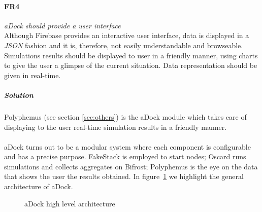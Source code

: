 \paragraph{FR4}\label{p:fr4} \emph{aDock should provide a user interface} \hfill \\
Although Firebase provides an interactive user interface, data is displayed in a \textit{JSON} fashion and it is, therefore, not easily understandable and browseable. Simulations results should be displayed to user in a friendly manner, using charts to give the user a glimpse of the current situation. Data representation should be given in real-time.
\subparagraph{Solution} Polyphemus (see section \ref{sec:others}) is the aDock module which takes care of displaying to the user real-time simulation results in a friendly manner.

\paragraph{}\label{p:adock_archi} aDock turns out to be a modular system where each component is configurable and has a precise purpose. FakeStack is employed to start nodes; Oscard runs simulations and collects aggregates on Bifrost; Polyphemus is the eye on the data that shows the user the results obtained.
In figure~\ref{fig:adock_high_arch} we highlight the general architecture of aDock.

\begin{figure}[!ht]
\label{fig:adock_high_arch}
\caption{aDock high level architecture}
\end{figure}

